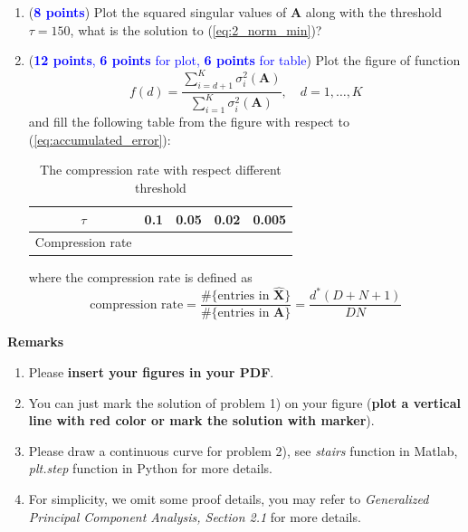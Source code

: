 \documentclass[english,onecolumn]{IEEEtran}
\begin{document}
\begin{enumerate}
    \item (\textcolor{blue}{\textbf{8 points}}) Plot the squared singular values of $\mathbf{A}$  along with the threshold $\tau=150$, what is the solution to (\ref{eq:2_norm_min})?
    \item (\textcolor{blue}{\textbf{12 points}, \textbf{6 points} for plot, \textbf{6 points} for table}) Plot the figure of function 
    \begin{equation}
        f(d)=\frac{\sum_{i=d+1}^K\sigma_{i}^2(\mathbf{A})}{\sum_{i=1}^K\sigma_i^2(\mathbf{A})},\quad d=1,\dots,K
    \end{equation}
    and fill the following table from the figure with respect to (\ref{eq:accumulated_error}):
    \begin{table}[htb]
    \centering
    \begin{tabular}{|l|l|l|l|l|}
    \hline
    \multicolumn{1}{|c|}{$\tau$} & 0.1 & 0.05 & 0.02 & 0.005 \\ \hline
    Compression rate             &   &    &   &  \\ \hline
    \end{tabular}
    \caption{The compression rate with respect different threshold}
    \end{table}
    
    where the compression rate is defined as 
    \begin{equation}
        \text{compression rate}=\frac{\#\{\text{entries in } \hat{\mathbf{X}}\}}{\#\{\text{entries in } \mathbf{A}\}}=\frac{d^*(D+N+1)}{DN}
    \end{equation}
\end{enumerate}



{\bf Remarks}
\begin{enumerate}
    \item Please \textbf{insert your figures in your PDF}.
    \item You can just mark the solution of problem 1) on your figure (\textbf{plot a vertical line with red color or mark the solution with marker}).
    \item Please draw a continuous curve for problem 2), see \textit{stairs} function in Matlab, \textit{plt.step} function in Python for more details.
    \item For simplicity, we omit some proof details, you may refer to \textit{Generalized Principal Component Analysis, Section 2.1} for more details.
\end{enumerate}
\end{document}
